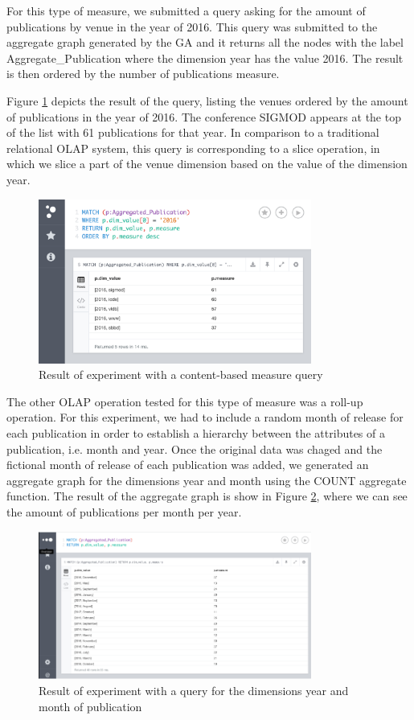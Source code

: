 For this type of measure, we submitted a query asking for the amount of publications by venue in the year of 2016. This query was submitted to the aggregate graph generated by the GA and it returns all the nodes with the label Aggregate\_Publication where the dimension year has the value 2016. The result is then ordered by the number of publications measure.

Figure \ref{fig:figure34} depicts the result of the query, listing the venues ordered by the amount of publications in the year of 2016. The conference SIGMOD appears at the top of the list with 61 publications for that year. In comparison to a traditional relational OLAP system, this query is corresponding to a slice operation, in which we slice a part of the venue dimension based on the value of the dimension year.

\begin{figure}[!h]
\centering
\includegraphics[width=0.8\textwidth]{../exp_content_measure.png}
\caption{Result of experiment with a content-based measure query}
\label{fig:figure34}
\end{figure}

The other OLAP operation tested for this type of measure was a roll-up operation. For this experiment, we had to include a random month of release for each publication in order to establish a hierarchy between the attributes of a publication, i.e. month and year. Once the original data was chaged and the fictional month of release of each publication was added, we generated an aggregate graph for the dimensions year and month using the COUNT aggregate function. The result of the aggregate graph is show in Figure \ref{fig:figure341}, where we can see the amount of publications per month per year.

\begin{figure}[!h]
\centering
\includegraphics[width=0.8\textwidth]{../exp_content_measure_rollup_1.png}
\caption{Result of experiment with a query for the dimensions year and month of publication}
\label{fig:figure341}
\end{figure}

